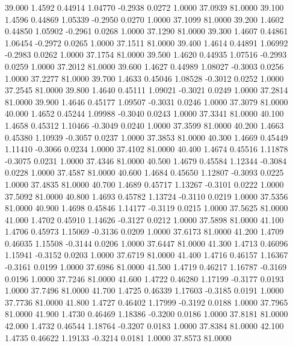   39.000   1.4592   0.44914   1.04770  -0.2938   0.0272   1.0000  37.0939  81.0000
  39.100   1.4596   0.44869   1.05339  -0.2950   0.0270   1.0000  37.1099  81.0000
  39.200   1.4602   0.44850   1.05902  -0.2961   0.0268   1.0000  37.1290  81.0000
  39.300   1.4607   0.44861   1.06454  -0.2972   0.0265   1.0000  37.1511  81.0000
  39.400   1.4614   0.44891   1.06992  -0.2983   0.0262   1.0000  37.1754  81.0000
  39.500   1.4620   0.44935   1.07516  -0.2993   0.0259   1.0000  37.2012  81.0000
  39.600   1.4627   0.44989   1.08027  -0.3003   0.0256   1.0000  37.2277  81.0000
  39.700   1.4633   0.45046   1.08528  -0.3012   0.0252   1.0000  37.2545  81.0000
  39.800   1.4640   0.45111   1.09021  -0.3021   0.0249   1.0000  37.2814  81.0000
  39.900   1.4646   0.45177   1.09507  -0.3031   0.0246   1.0000  37.3079  81.0000
  40.000   1.4652   0.45244   1.09988  -0.3040   0.0243   1.0000  37.3341  81.0000
  40.100   1.4658   0.45312   1.10466  -0.3049   0.0240   1.0000  37.3599  81.0000
  40.200   1.4663   0.45380   1.10939  -0.3057   0.0237   1.0000  37.3853  81.0000
  40.300   1.4669   0.45449   1.11410  -0.3066   0.0234   1.0000  37.4102  81.0000
  40.400   1.4674   0.45516   1.11878  -0.3075   0.0231   1.0000  37.4346  81.0000
  40.500   1.4679   0.45584   1.12344  -0.3084   0.0228   1.0000  37.4587  81.0000
  40.600   1.4684   0.45650   1.12807  -0.3093   0.0225   1.0000  37.4835  81.0000
  40.700   1.4689   0.45717   1.13267  -0.3101   0.0222   1.0000  37.5092  81.0000
  40.800   1.4693   0.45782   1.13724  -0.3110   0.0219   1.0000  37.5356  81.0000
  40.900   1.4698   0.45846   1.14177  -0.3119   0.0215   1.0000  37.5625  81.0000
  41.000   1.4702   0.45910   1.14626  -0.3127   0.0212   1.0000  37.5898  81.0000
  41.100   1.4706   0.45973   1.15069  -0.3136   0.0209   1.0000  37.6173  81.0000
  41.200   1.4709   0.46035   1.15508  -0.3144   0.0206   1.0000  37.6447  81.0000
  41.300   1.4713   0.46096   1.15941  -0.3152   0.0203   1.0000  37.6719  81.0000
  41.400   1.4716   0.46157   1.16367  -0.3161   0.0199   1.0000  37.6986  81.0000
  41.500   1.4719   0.46217   1.16787  -0.3169   0.0196   1.0000  37.7246  81.0000
  41.600   1.4722   0.46280   1.17199  -0.3177   0.0193   1.0000  37.7496  81.0000
  41.700   1.4725   0.46339   1.17603  -0.3185   0.0191   1.0000  37.7736  81.0000
  41.800   1.4727   0.46402   1.17999  -0.3192   0.0188   1.0000  37.7965  81.0000
  41.900   1.4730   0.46469   1.18386  -0.3200   0.0186   1.0000  37.8181  81.0000
  42.000   1.4732   0.46544   1.18764  -0.3207   0.0183   1.0000  37.8384  81.0000
  42.100   1.4735   0.46622   1.19133  -0.3214   0.0181   1.0000  37.8573  81.0000
